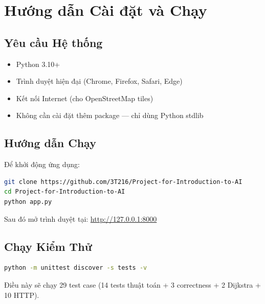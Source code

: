 \appendix

\chapter{Hướng dẫn Cài đặt và Chạy}

\section{Yêu cầu Hệ thống}

\begin{itemize}
  \item Python 3.10+
  \item Trình duyệt hiện đại (Chrome, Firefox, Safari, Edge)
  \item Kết nối Internet (cho OpenStreetMap tiles)
  \item Không cần cài đặt thêm package --- chỉ dùng Python stdlib
\end{itemize}

\section{Hướng dẫn Chạy}

Để khởi động ứng dụng:

\begin{lstlisting}[language=bash, caption=Khởi động ứng dụng]
git clone https://github.com/3T216/Project-for-Introduction-to-AI
cd Project-for-Introduction-to-AI
python app.py
\end{lstlisting}

Sau đó mở trình duyệt tại: \url{http://127.0.0.1:8000}

\section{Chạy Kiểm Thử}

\begin{lstlisting}[language=bash, caption=Chạy bộ test]
python -m unittest discover -s tests -v
\end{lstlisting}

Điều này sẽ chạy 29 test case (14 tests thuật toán + 3 correctness + 2 Dijkstra + 10 HTTP).


